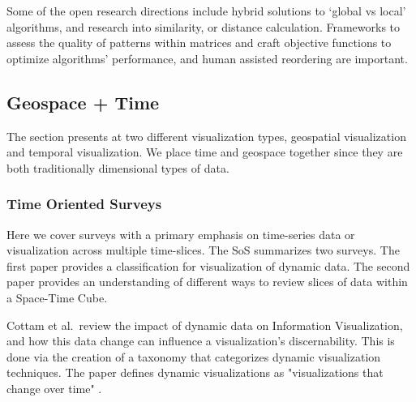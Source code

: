 
Some of the open research directions include hybrid solutions to `global vs local' algorithms, and research into similarity, or distance calculation. Frameworks to assess the quality of patterns within matrices and craft objective functions  to optimize algorithms' performance, and human assisted reordering are important.




\subsection{Geospace + Time}
The section presents at two different visualization types, geospatial visualization and temporal visualization. We place time and geospace together since they are both traditionally dimensional types of data.
\subsubsection{Time Oriented Surveys}
Here we cover surveys with a primary emphasis on time-series data or visualization across multiple time-slices. The SoS summarizes two surveys. The first paper provides a classification for visualization of dynamic data. The second paper provides an understanding of different ways to review slices of data within a Space-Time Cube. 

Cottam et al.\ review the impact of dynamic data on Information Visualization, and how this data change can influence a visualization's discernability. This is done via the creation of a taxonomy that categorizes dynamic visualization techniques. The paper defines dynamic visualizations as "visualizations that change over time" \cite{cottam2012watch}.

